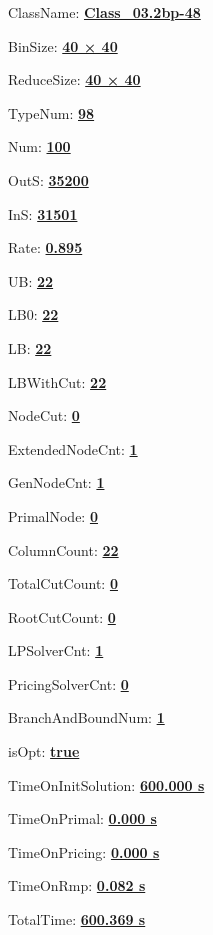 \documentclass[11pt]{article}
\begin{document}
\pagestyle{empty}


ClassName: \underline{\textbf{Class_03.2bp-48}}
\par
BinSize: \underline{\textbf{40 × 40}}
\par
ReduceSize: \underline{\textbf{40 × 40}}
\par
TypeNum: \underline{\textbf{98}}
\par
Num: \underline{\textbf{100}}
\par
OutS: \underline{\textbf{35200}}
\par
InS: \underline{\textbf{31501}}
\par
Rate: \underline{\textbf{0.895}}
\par
UB: \underline{\textbf{22}}
\par
LB0: \underline{\textbf{22}}
\par
LB: \underline{\textbf{22}}
\par
LBWithCut: \underline{\textbf{22}}
\par
NodeCut: \underline{\textbf{0}}
\par
ExtendedNodeCnt: \underline{\textbf{1}}
\par
GenNodeCnt: \underline{\textbf{1}}
\par
PrimalNode: \underline{\textbf{0}}
\par
ColumnCount: \underline{\textbf{22}}
\par
TotalCutCount: \underline{\textbf{0}}
\par
RootCutCount: \underline{\textbf{0}}
\par
LPSolverCnt: \underline{\textbf{1}}
\par
PricingSolverCnt: \underline{\textbf{0}}
\par
BranchAndBoundNum: \underline{\textbf{1}}
\par
isOpt: \underline{\textbf{true}}
\par
TimeOnInitSolution: \underline{\textbf{600.000 s}}
\par
TimeOnPrimal: \underline{\textbf{0.000 s}}
\par
TimeOnPricing: \underline{\textbf{0.000 s}}
\par
TimeOnRmp: \underline{\textbf{0.082 s}}
\par
TotalTime: \underline{\textbf{600.369 s}}
\par
\newpage


\end{document}
